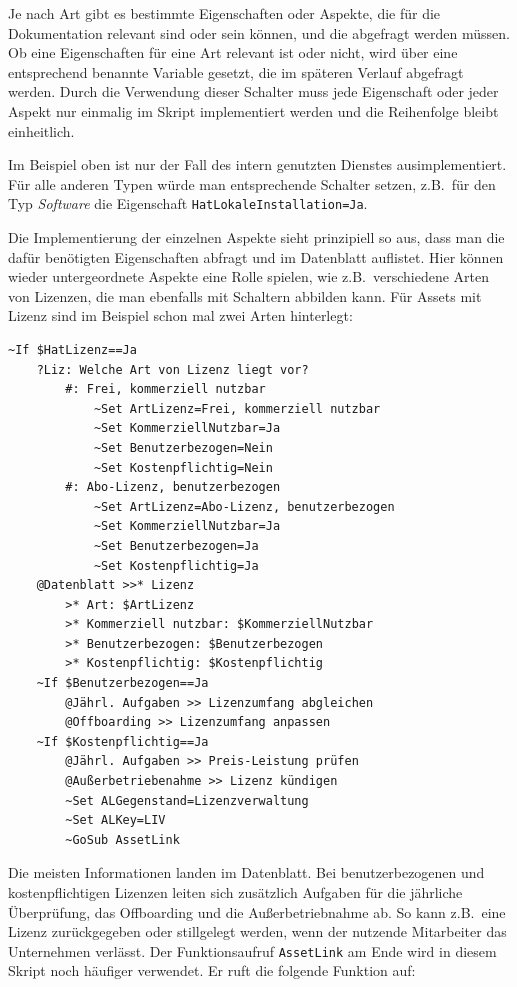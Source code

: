 Je nach Art gibt es bestimmte Eigenschaften oder Aspekte, die für die Dokumentation relevant sind oder sein können, und die abgefragt werden müssen. Ob eine Eigenschaften für eine Art relevant ist oder nicht, wird über eine entsprechend benannte Variable gesetzt, die im späteren Verlauf abgefragt werden. Durch die Verwendung dieser Schalter muss jede Eigenschaft oder jeder Aspekt nur einmalig im Skript implementiert werden und die Reihenfolge bleibt einheitlich.

Im Beispiel oben ist nur der Fall des intern genutzten Dienstes ausimplementiert. Für alle anderen Typen würde man entsprechende Schalter setzen, z.B.\ für den Typ \emph{Software} die Eigenschaft \verb|HatLokaleInstallation=Ja|.

Die Implementierung der einzelnen Aspekte sieht prinzipiell so aus, dass man die dafür benötigten Eigenschaften abfragt und im Datenblatt auflistet. Hier können wieder untergeordnete Aspekte eine Rolle spielen, wie z.B.\ verschiedene Arten von Lizenzen, die man ebenfalls mit Schaltern abbilden kann. Für Assets mit Lizenz sind im Beispiel schon mal zwei Arten hinterlegt:

\label{BspAsset2}
\begin{verbatim}
~If $HatLizenz==Ja    
    ?Liz: Welche Art von Lizenz liegt vor?
        #: Frei, kommerziell nutzbar
            ~Set ArtLizenz=Frei, kommerziell nutzbar
            ~Set KommerziellNutzbar=Ja
            ~Set Benutzerbezogen=Nein
            ~Set Kostenpflichtig=Nein
        #: Abo-Lizenz, benutzerbezogen
            ~Set ArtLizenz=Abo-Lizenz, benutzerbezogen
            ~Set KommerziellNutzbar=Ja
            ~Set Benutzerbezogen=Ja
            ~Set Kostenpflichtig=Ja
    @Datenblatt >>* Lizenz
        >* Art: $ArtLizenz
        >* Kommerziell nutzbar: $KommerziellNutzbar
        >* Benutzerbezogen: $Benutzerbezogen
        >* Kostenpflichtig: $Kostenpflichtig
    ~If $Benutzerbezogen==Ja
        @Jährl. Aufgaben >> Lizenzumfang abgleichen
        @Offboarding >> Lizenzumfang anpassen
    ~If $Kostenpflichtig==Ja
        @Jährl. Aufgaben >> Preis-Leistung prüfen
        @Außerbetriebenahme >> Lizenz kündigen
        ~Set ALGegenstand=Lizenzverwaltung
        ~Set ALKey=LIV
        ~GoSub AssetLink
\end{verbatim}

Die meisten Informationen landen im Datenblatt. Bei benutzerbezogenen und kostenpflichtigen Lizenzen leiten sich zusätzlich Aufgaben für die jährliche Überprüfung, das Offboarding und die Außerbetriebnahme ab. So kann z.B.\ eine Lizenz zurückgegeben oder stillgelegt werden, wenn der nutzende Mitarbeiter das Unternehmen verlässt. Der Funktionsaufruf \verb|AssetLink| am Ende wird in diesem Skript noch häufiger verwendet. Er ruft die folgende Funktion auf:

